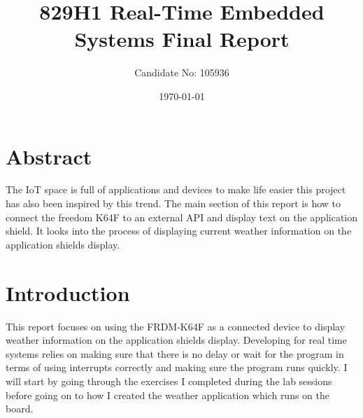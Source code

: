 \documentclass[a4paper,12pt]{scrartcl}
\title{829H1 Real-Time Embedded Systems Final Report}
\author{Candidate No: 105936}
\date{\today}
\begin{document}
	
	\begin{titlepage}
		\maketitle
	\end{titlepage}
	
	\tableofcontents
	\newpage

	\section{Abstract}
	{
		The IoT space is full of applications and devices to make life easier this project has also been inspired by this trend. The main section of this report is how to connect the freedom K64F\cite{nxpproducts2014} to an external API and display text on the application shield. It looks into the process of displaying current weather information on the application shields display.
	}

	\section{Introduction}
	{
		This report focuses on using the FRDM-K64F\cite{nxpproducts2014} as a connected device to display weather information on the application shields display. Developing for real time systems relies on making sure that there is no delay or wait for the program in terms of using interrupts correctly and making sure the program runs quickly. I will start by going through the exercises I completed during the lab sessions before going on to how I created the weather application which runs on the board. 
	}
	
\end{document}
